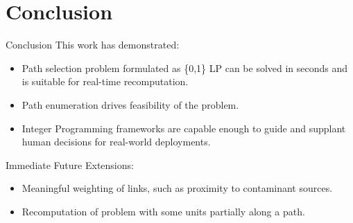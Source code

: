 \documentclass[xcolor=pdflatex,dvipsnames,table]{beamer}
\begin{document}
\section{Conclusion}
\begin{frame}{Conclusion}
This work has demonstrated:
 \begin{itemize}
  \small
  \item Path selection problem formulated as \{0,1\} LP can be solved in seconds and is suitable for real-time recomputation.
  \item Path enumeration drives feasibility of the problem.
  \item Integer Programming frameworks are capable enough to guide and supplant human decisions for real-world deployments.
 \end{itemize}
Immediate Future Extensions:
 \begin{itemize}
  \small
  \item Meaningful weighting of links, such as proximity to contaminant sources.
  \item Recomputation of problem with some units partially along a path.
 \end{itemize}
\end{frame}
\end{document}
